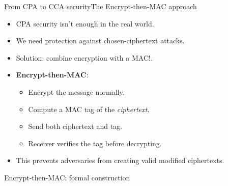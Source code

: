 \documentclass[aspectratio=169, lualatex, handout]{beamer}
\begin{document}
\begin{frame}{From CPA to CCA security}{The Encrypt-then-MAC approach}
	\begin{itemize}[<+->]
		\item CPA security isn't enough in the real world.
		\item We need protection against chosen-ciphertext attacks.
		\item Solution: combine encryption with a MAC!.
		\item \textbf{Encrypt-then-MAC}:
		      \begin{itemize}
			      \item Encrypt the message normally.
			      \item Compute a MAC tag of the \textit{ciphertext}.
			      \item Send both ciphertext and tag.
			      \item Receiver verifies the tag before decrypting.
		      \end{itemize}
		\item This prevents adversaries from creating valid modified ciphertexts.
	\end{itemize}
\end{frame}

\begin{frame}{Encrypt-then-MAC: formal construction}
	\begin{columns}[c]
		\begin{column}{0.45\textwidth}
		\end{column}
		\begin{column}{0.55\textwidth}
		\end{column}
	\end{columns}
\end{frame}
\end{document}
